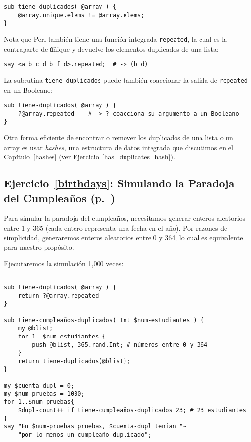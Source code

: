 \begin{verbatim}
sub tiene-duplicados( @array ) {
    @array.unique.elems != @array.elems;
}
\end{verbatim}

Nota que Perl también tiene una función integrada {\tt repeated},
la cual es la contraparte de {\t unique} y devuelve los elementos
duplicados de una lista: 

\begin{verbatim}
say <a b c d b f d>.repeated;  # -> (b d)
\end{verbatim}

La subrutina {\tt tiene-duplicados} puede también coaccionar
la salida de {\tt repeated} en un Booleano:
\begin{verbatim}
sub tiene-duplicados( @array ) {
    ?@array.repeated 	# -> ? coacciona su argumento a un Booleano
}
\end{verbatim}

Otra forma eficiente de encontrar o remover los duplicados
de una lista o un array es usar \emph{hashes}, una 
estructura de datos integrada que discutimos en el Capítulo~\ref{hashes} 
(ver Ejercicio~\ref{has_duplicates_hash}).

\subsection{Ejercicio~\ref{birthdays}: Simulando la Paradoja del Cumpleaños (p.~\pageref{birthdays})}
\label{sol_birthdays}

Para simular la paradoja del cumpleaños, necesitamos
generar enteros aleatorios entre 1 y 365 (cada entero
representa una fecha en el año). Por razones de
simplicidad, generaremos enteros aleatorios entre 
0 y 364, lo cual es equivalente para nuestro propósito.

Ejecutaremos la simulación 1,000 veces:

\begin{verbatim}

sub tiene-duplicados( @array ) {
    return ?@array.repeated
}

sub tiene-cumpleaños-duplicados( Int $num-estudiantes ) {
    my @blist;
    for 1..$num-estudiantes {
        push @blist, 365.rand.Int; # números entre 0 y 364
    }
    return tiene-duplicados(@blist);
}

my $cuenta-dupl = 0;
my $num-pruebas = 1000;
for 1..$num-pruebas{
    $dupl-count++ if tiene-cumpleaños-duplicados 23; # 23 estudiantes
}
say "En $num-pruebas pruebas, $cuenta-dupl tenían "~
	"por lo menos un cumpleaño duplicado";
\end{verbatim}

